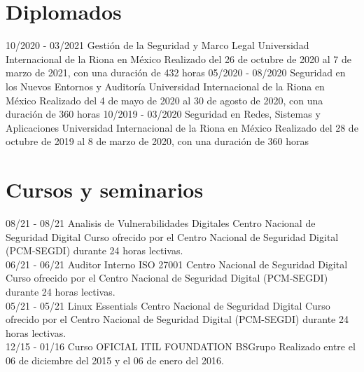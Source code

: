 \documentclass[]{friggeri-cv}
\begin{document}
\section {Diplomados}
\begin{entrylist}
  \entry
  {10/2020 - 03/2021}
  {Gestión de la Seguridad y Marco Legal}
  {Universidad Internacional de la Riona en México}
  {Realizado del 26 de octubre de 2020 al 7 de marzo de 2021, con una duración de 432 horas}
  \entry
  {05/2020 - 08/2020}
  {Seguridad en los Nuevos Entornos y Auditoría}
  {Universidad Internacional de la Riona en México}
  {Realizado del 4 de mayo de 2020 al 30 de agosto de 2020, con una duración de 360 horas}
  \entry
  {10/2019 - 03/2020}
  {Seguridad en Redes, Sistemas y Aplicaciones}
  {Universidad Internacional de la Riona en México}
  {Realizado del 28 de octubre de 2019 al 8 de marzo de 2020, con una duración de 360 horas}
\end{entrylist}

\section{Cursos y seminarios}
\begin{entrylist}
    \entry
    {08/21 - 08/21}
    {Analisis de Vulnerabilidades Digitales}
    {Centro Nacional de Seguridad Digital}
    {Curso ofrecido por el Centro Nacional de Seguridad Digital (PCM-SEGDI) durante 24 horas lectivas.\\}
    \entry
    {06/21 - 06/21}
    {Auditor Interno ISO 27001}
    {Centro Nacional de Seguridad Digital}
    {Curso ofrecido por el Centro Nacional de Seguridad Digital (PCM-SEGDI) durante 24 horas lectivas.\\}
    \entry
    {05/21 - 05/21}
    {Linux Essentials}
    {Centro Nacional de Seguridad Digital}
    {Curso ofrecido por el Centro Nacional de Seguridad Digital (PCM-SEGDI) durante 24 horas lectivas.\\}
    \entry
    {12/15 - 01/16}
    {Curso OFICIAL ITIL FOUNDATION}
    {BSGrupo}
    {Realizado entre el 06 de diciembre del 2015 y el 06 de enero del 2016.\\}
\end{entrylist}

\newpage
\end{document}
